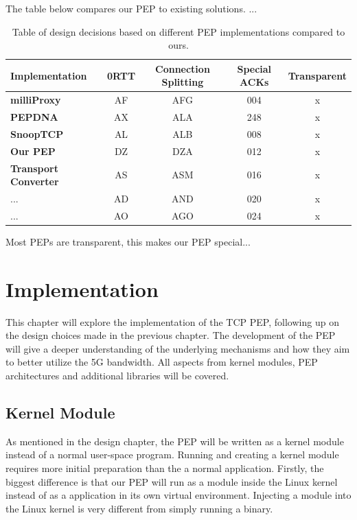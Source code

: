 \documentclass[a4paper,english, 11pt]{report}
\begin{document}
The table below compares our PEP to existing solutions. ...\\

\begin{table}[h!]
\centering
\begin{tabularx}{\linewidth}{lCCCC}
\toprule
Implementation & 0RTT & Connection Splitting & Special ACKs & Transparent \\
\midrule
\textbf{milliProxy} & AF & AFG & 004 & x \\
\textbf{PEPDNA} & AX & ALA & 248 & x \\
\textbf{SnoopTCP} & AL & ALB & 008 & x \\
\textbf{Our PEP} & DZ & DZA & 012 & x \\
\textbf{Transport Converter} & AS & ASM & 016 & x \\
... & AD & AND & 020 & x \\
... & AO & AGO & 024 & x \\
\bottomrule
\end{tabularx}
\caption{Table of design decisions based on different PEP implementations compared to ours.}
\end{table}

Most PEPs are transparent, this makes our PEP special...




\chapter{Implementation}
This chapter will explore the implementation of the TCP PEP, following up on the design choices made in the previous chapter. The development of the PEP will give a deeper understanding of the underlying mechanisms and how they aim to better utilize the 5G bandwidth. All aspects from kernel modules, PEP architectures and additional libraries will be covered.

\section{Kernel Module}
As mentioned in the design chapter, the PEP will be written as a kernel module instead of a normal user-space program. Running and creating a kernel module requires more initial preparation than the a normal application. Firstly, the biggest difference is that our PEP will run as a module inside the Linux kernel instead of as a application in its own virtual environment. Injecting a module into the Linux kernel is very different from simply running a binary.\\
\end{document}
